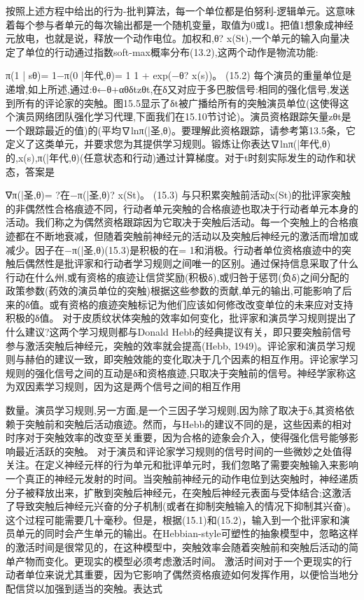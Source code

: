 按照上述方程中给出的行为-批判算法，每一个单位都是伯努利-逻辑单元。这意味着每个参与者单元的每次输出都是一个随机变量，取值为0或1。把值1想象成神经元放电，也就是说，释放一个动作电位。加权和,θ? x(St),一个单元的输入向量决定了单位的行动通过指数soft-max概率分布(13.2),这两个动作是物流功能:

π(1 | sθ)= 1−π(0 |年代,θ)= 1
1 + exp(−θ? x(s))。 					(15.2)
每个演员的重量单位是递增,如上所述,通过:θ←θ+αθδtzθt,在δ又对应于多巴胺信号:相同的强化信号,发送到所有的评论家的突触。图15.5显示了δt被广播给所有的突触演员单位(这使得这个演员网络团队强化学习代理,下面我们在15.10节讨论)。演员资格跟踪矢量zθt是一个跟踪最近的值)的(平均∇lnπ(|圣,θ)。要理解此资格跟踪，请参考第13.5条，它定义了这类单元，并要求您为其提供学习规则。锻炼让你表达∇lnπ(|年代,θ)的,x(s),π(|年代,θ)(任意状态和行动)通过计算梯度。对于t时刻实际发生的动作和状态，答案是

∇π(|圣,θ)= ?在−π(|圣,θ)? x(St)。 					(15.3)
与只积累突触前活动x(St)的批评家突触的非偶然性合格痕迹不同，行动者单元突触的合格痕迹也取决于行动者单元本身的活动。我们称之为偶然资格跟踪因为它取决于突触后活动。每一个突触上的合格痕迹都在不断地衰减，但随着突触前神经元的活动以及突触后神经元的激活而增加或减少。因子在−π(|圣,θ)(15.3)是积极的在= 1和消极。行动者单位资格痕迹中的突触后偶然性是批评家和行动者学习规则之间唯一的区别。通过保持信息采取了什么行动在什么州,或有资格的痕迹让信贷奖励(积极δ),或归咎于惩罚(负δ)之间分配的政策参数(药效的演员单位的突触)根据这些参数的贡献,单元的输出,可能影响了后来的δ值。或有资格的痕迹突触标记为他们应该如何修改改变单位的未来应对支持积极的δ值。
对于皮质纹状体突触的效率如何变化，批评家和演员学习规则提出了什么建议?这两个学习规则都与Donald Hebb的经典提议有关，即只要突触前信号参与激活突触后神经元，突触的效率就会提高(Hebb, 1949)。评论家和演员学习规则与赫伯的建议一致，即突触效能的变化取决于几个因素的相互作用。评论家学习规则的强化信号之间的互动是δ和资格痕迹,只取决于突触前的信号。神经学家称这为双因素学习规则，因为这是两个信号之间的相互作用

数量。演员学习规则,另一方面,是一个三因子学习规则,因为除了取决于δ,其资格依赖于突触前和突触后活动痕迹。然而，与Hebb的建议不同的是，这些因素的相对时序对于突触效率的改变至关重要，因为合格的迹象会介入，使得强化信号能够影响最近活跃的突触。
对于演员和评论家学习规则的信号时间的一些微妙之处值得关注。在定义神经元样的行为单元和批评单元时，我们忽略了需要突触输入来影响一个真正的神经元发射的时间。当突触前神经元的动作电位到达突触时，神经递质分子被释放出来，扩散到突触后神经元，在突触后神经元表面与受体结合;这激活了导致突触后神经元兴奋的分子机制(或者在抑制突触输入的情况下抑制其兴奋)。这个过程可能需要几十毫秒。但是，根据(15.1)和(15.2)，输入到一个批评家和演员单元的同时会产生单元的输出。在Hebbian-style可塑性的抽象模型中，忽略这样的激活时间是很常见的，在这种模型中，突触效率会随着突触前和突触后活动的简单产物而变化。更现实的模型必须考虑激活时间。
激活时间对于一个更现实的行动者单位来说尤其重要，因为它影响了偶然资格痕迹如何发挥作用，以便恰当地分配信贷以加强到适当的突触。表达式

